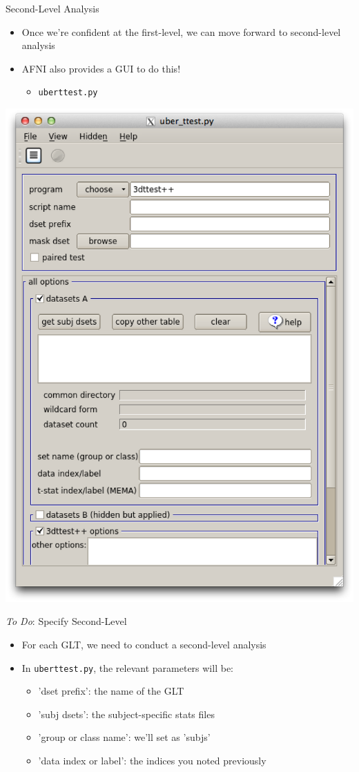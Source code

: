 \documentclass[t,12pt]{beamer}
\begin{document}
\begin{frame}{Second-Level Analysis}
\vspace{10pt}
\begin{itemize}
\setlength\itemsep{1em}
\item Once we're confident at the first-level, we can move forward to second-level analysis
\item AFNI also provides a GUI to do this!
\vspace{4pt}
\begin{itemize}
\item \texttt{uber\textunderscore{}ttest.py}
\end{itemize}
\end{itemize}
\vspace{4pt}
\centering
\includegraphics[width=.65\textwidth]{images/uber_ttest.png}
\end{frame}

\begin{frame}{\emph{To Do}: Specify Second-Level}
\vspace{10pt}
\begin{itemize}
\setlength\itemsep{1em}
\item For each GLT, we need to conduct a second-level analysis
\item In \texttt{uber\textunderscore{}ttest.py}, the relevant parameters will be:
\vspace{4pt}
\begin{itemize}
\setlength\itemsep{0.5em}
\item 'dset prefix': the name of the GLT
\item 'subj dsets': the subject-specific stats files
\item 'group or class name': we'll set as 'subjs'
\item 'data index or label': the indices you noted previously
\end{itemize} 
\end{itemize}
\end{frame}
\end{document}
